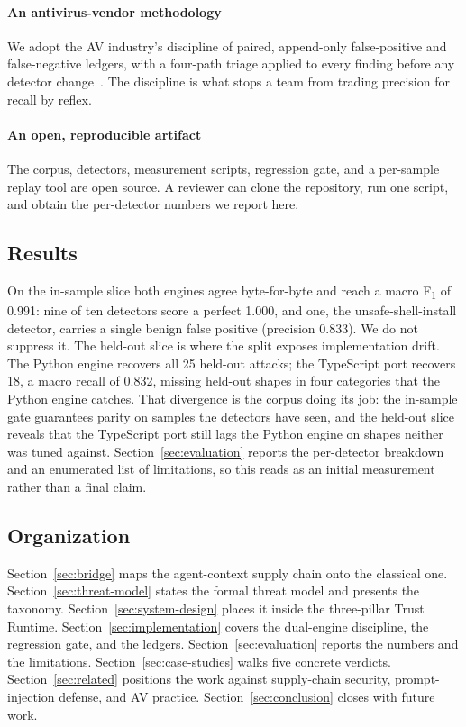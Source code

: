 \paragraph{An antivirus-vendor methodology} We adopt the AV industry's
discipline of paired, append-only false-positive and false-negative
ledgers, with a four-path triage applied to every finding before any
detector change~\cite{Christodorescu:2003:static-malware}. The
discipline is what stops a team from trading precision for recall by
reflex.

\paragraph{An open, reproducible artifact} The corpus, detectors,
measurement scripts, regression gate, and a per-sample replay tool are
open source. A reviewer can clone the repository, run one script, and
obtain the per-detector numbers we report here.

\subsection{Results}

On the in-sample slice both engines agree byte-for-byte and reach a
macro F\textsubscript{1} of 0.991: nine of ten detectors score a perfect
1.000, and one, the unsafe-shell-install detector, carries a single
benign false positive (precision 0.833). We do not suppress it. The
held-out slice is where the split exposes implementation drift. The
Python engine
recovers all 25 held-out attacks; the TypeScript port recovers 18, a
macro recall of 0.832, missing held-out shapes in four categories that
the Python engine catches. That divergence is the corpus doing its job:
the in-sample gate guarantees parity on samples the detectors have seen,
and the held-out slice reveals that the TypeScript port still lags the
Python engine on shapes neither was tuned against.
Section~\ref{sec:evaluation} reports the per-detector breakdown and an
enumerated list of limitations, so this reads as an initial measurement
rather than a final claim.

\subsection{Organization}

Section~\ref{sec:bridge} maps the agent-context supply chain onto the
classical one. Section~\ref{sec:threat-model} states the formal threat
model and presents the taxonomy.
Section~\ref{sec:system-design} places it inside the three-pillar Trust
Runtime. Section~\ref{sec:implementation} covers the dual-engine
discipline, the regression gate, and the ledgers.
Section~\ref{sec:evaluation} reports the numbers and the limitations.
Section~\ref{sec:case-studies} walks five concrete verdicts.
Section~\ref{sec:related} positions the work against supply-chain
security, prompt-injection defense, and AV practice.
Section~\ref{sec:conclusion} closes with future work.
